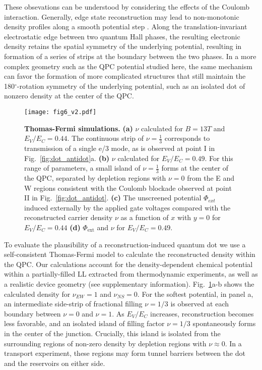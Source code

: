 \documentclass[reprint,prl,aps,superscriptaddress]{revtex4-1}
\begin{document}
These obsevations can be understood by considering the effects of the Coulomb interaction.  Generally, edge state reconstruction may lead to non-monotonic density profiles along a smooth potential step \cite{chamon_sharp_1994,khanna_fractional_2021}. 
Along the translation-invariant electrostatic edge between two quantum Hall phases, the resulting electronic density retains the spatial symmetry of the underlying potential, resulting in formation of a series of strips at the boundary between the two phases. 
In a more complex geometry such as the QPC potential studied here, the same mechanism can favor the formation of more complicated structures that still maintain the 180$^\circ$-rotation symmetry of the underlying potential, such as an isolated dot of nonzero density at the center of the QPC.

\begin{figure}[ht]
    \centering
    \texttt{[image: fig6\_v2.pdf]}
    \caption{
    \textbf{Thomas-Fermi simulations.} 
    \textbf{(a)} $\nu$ calculated for $B = 13T$ and $E_V/E_C = 0.44$.  The continuous strip of $\nu=\tfrac13$ corresponds to transmission of a single e/3 mode, as is observed at point I in Fig.~\ref{fig:dot_antidot}a.  
    \textbf{(b)} $\nu$ calculated for $E_V/E_C = 0.49$.  
    For this range of parameters, a small island of $\nu=\tfrac13$ forms at the center of the QPC, separated by depletion regions with $\nu=0$ from the E and W regions consistent with the Coulomb blockade observed at point II in Fig.~\ref{fig:dot_antidot}.
     \textbf{(c)} The unscreened potential $\Phi_{ext}$ induced externally by the applied gate voltages compared with the reconstructed carrier density $\nu$ as a function of $x$ with $y=0$ for $E_V/E_C = 0.44$ 
    \textbf{(d)} $\Phi_\textrm{ext}$ and $\nu$ for $E_V/E_C = 0.49$. 
    }
    \label{fig:TF_reconstruction}
\end{figure}

To evaluate the plausibility of a reconstruction-induced quantum dot we use a self-consistent Thomas-Fermi model to calculate the reconstructed density within the QPC.  Our  calculations account for the density-dependent chemical potential within a partially-filled LL extracted from thermodynamic experiments\cite{yang_experimental_2021}, as well as a realistic device geometry (see supplementary information). 
Fig.~\ref{fig:TF_reconstruction}a-b shows the calculated density for $\nu_{EW} = 1$ and $\nu_{NS} = 0$. 
For the softest potential, in panel a, an intermediate side-strip of fractional filling $\nu = 1/3$ is observed at each boundary between $\nu = 0$ and $\nu = 1$. 
As $E_V/E_C$  increases,  reconstruction  becomes less favorable, and an isolated island of filling factor $\nu=1/3$ spontaneously forms in the center of the junction. Crucially, this island is isolated from the surrounding regions of non-zero density by depletion regions with $\nu\approx 0$.  
In a transport experiment, these regions may form tunnel barriers between the dot and the reservoirs on either side. 
\end{document}
